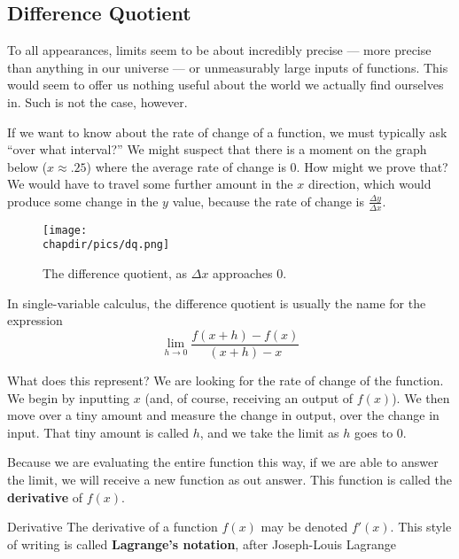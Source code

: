 
\subsection{Difference Quotient}




To all appearances, limits seem to be about incredibly precise --- more precise
than anything in our universe --- or unmeasurably large inputs of functions.
This would seem to offer us nothing useful about the world we actually find ourselves
in.  Such is not the case, however.

If we want to know about the rate of change of a function, we must typically ask 
``over what interval?''  We might suspect that there is a moment on the graph below
($x\approx.25$) where the average rate of change is 0.  How might we prove that?
We would have to travel some further amount in the $x$ direction, which would
produce some change in the $y$ value, because the rate of change is $\frac{\Delta y}
{\Delta x}$.

\begin{figure}
\begin{center}
\texttt{[image: \\chapdir/pics/dq.png]}
\caption{The difference quotient, as $\Delta x$ approaches 0\cite{tikzdq}.}
\end{center}
\end{figure}

In single-variable calculus, the difference quotient is usually the name for the expression
\begin{equation}
\lim_{h\rightarrow0}\frac {f(x+h)-f(x)}{(x+h)-x}
\end{equation}

What does this represent?  We are looking for the rate of change of the function.  We begin
by inputting $x$ (and, of course, receiving an output of $f(x)$).  We then move over a tiny 
amount and measure the change in output, over the change in input.  That tiny amount is called
$h$, and we take the limit as $h$ goes to 0.

Because we are evaluating the entire function this way, if we are able to answer the limit, 
we will receive a new function as out answer.  This function is called the \textbf{derivative} of
$f(x)$.


\begin{derivation}{Derivative}
The derivative of a function $f(x)$ may be denoted $f'(x)$.  This style of writing is
called \textbf{Lagrange's notation}, after Joseph-Louis Lagrange
\end{derivation}



